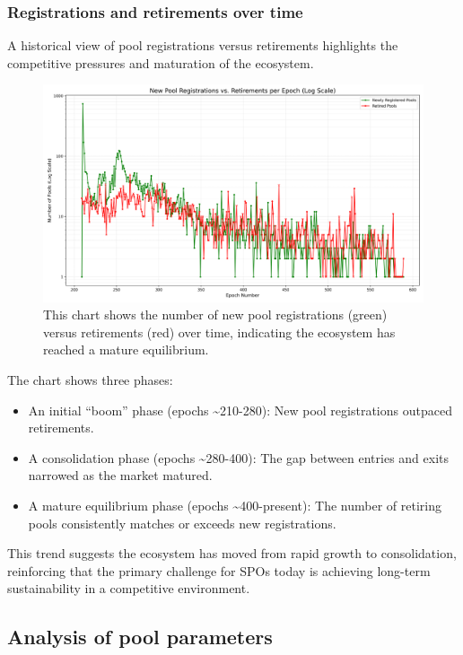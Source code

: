 \documentclass[11pt, letterpaper]{article}
\begin{document}
\subsubsection{Registrations and retirements over time}

A historical view of pool registrations versus retirements highlights the
competitive pressures and maturation of the ecosystem.

\begin{figure}[H]
	\centering
	\includegraphics[width=\textwidth]{img/pool_registrations_vs_retirements_log.png}
	\caption{This chart shows the number of new pool registrations (green) versus retirements (red) over time,
		indicating the ecosystem has reached a mature equilibrium.}
	\label{fig:pool-trends}
\end{figure}

The chart shows three phases:
\begin{itemize}
	\item An initial ``boom'' phase (epochs \textasciitilde210-280): New pool registrations
	      outpaced retirements.
	\item A consolidation phase (epochs \textasciitilde280-400): The gap between entries
	      and exits narrowed as the market matured.
	\item A mature equilibrium phase (epochs \textasciitilde400-present): The number of
	      retiring pools consistently matches or exceeds new registrations.
\end{itemize}

This trend suggests the ecosystem has moved from rapid growth to consolidation, reinforcing that the primary
challenge for SPOs today is achieving long-term sustainability in a competitive environment.

\subsection{Analysis of pool parameters}
\end{document}
